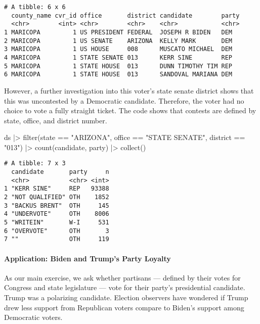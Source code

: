 \documentclass[fleqn,10pt]{wlscirep}
\let\oldparagraph\paragraph
\renewcommand{\paragraph}[1]{\oldparagraph{#1}\mbox{}}
\newenvironment{Shaded}{\begin{snugshade}}{\end{snugshade}}
\newcommand{\FunctionTok}[1]{\textcolor[rgb]{0.28,0.35,0.67}{#1}}
\newcommand{\NormalTok}[1]{\textcolor[rgb]{0.00,0.23,0.31}{#1}}
\newcommand{\SpecialCharTok}[1]{\textcolor[rgb]{0.37,0.37,0.37}{#1}}
\newcommand{\StringTok}[1]{\textcolor[rgb]{0.13,0.47,0.30}{#1}}
\begin{document}
\begin{verbatim}
# A tibble: 6 x 6
  county_name cvr_id office       district candidate        party
  <chr>        <int> <chr>        <chr>    <chr>            <chr>
1 MARICOPA         1 US PRESIDENT FEDERAL  JOSEPH R BIDEN   DEM  
2 MARICOPA         1 US SENATE    ARIZONA  KELLY MARK       DEM  
3 MARICOPA         1 US HOUSE     008      MUSCATO MICHAEL  DEM  
4 MARICOPA         1 STATE SENATE 013      KERR SINE        REP  
5 MARICOPA         1 STATE HOUSE  013      DUNN TIMOTHY TIM REP  
6 MARICOPA         1 STATE HOUSE  013      SANDOVAL MARIANA DEM  
\end{verbatim}

However, a further investigation into this voter's state senate district
shows that this was uncontested by a Democratic candidate. Therefore,
the voter had no choice to vote a fully straight ticket. The code shows
that contests are defined by state, office, and district number.

\begin{Shaded}
\begin{Highlighting}[]
\NormalTok{ds }\SpecialCharTok{|\textgreater{}} 
  \FunctionTok{filter}\NormalTok{(state }\SpecialCharTok{==} \StringTok{"ARIZONA"}\NormalTok{, office }\SpecialCharTok{==} \StringTok{"STATE SENATE"}\NormalTok{, district }\SpecialCharTok{==} \StringTok{"013"}\NormalTok{) }\SpecialCharTok{|\textgreater{}} 
  \FunctionTok{count}\NormalTok{(candidate, party) }\SpecialCharTok{|\textgreater{}} 
  \FunctionTok{collect}\NormalTok{()}
\end{Highlighting}
\end{Shaded}

\begin{verbatim}
# A tibble: 7 x 3
  candidate       party     n
  <chr>           <chr> <int>
1 "KERR SINE"     REP   93388
2 "NOT QUALIFIED" OTH    1852
3 "BACKUS BRENT"  OTH     145
4 "UNDERVOTE"     OTH    8006
5 "WRITEIN"       W-I     531
6 "OVERVOTE"      OTH       3
7 ""              OTH     119
\end{verbatim}

\paragraph{Application: Biden and Trump's Party Loyalty}

As our main exercise, we ask whether partisans --- defined by their
votes for Congress and state legislature --- vote for their party's
presidential candidate. Trump was a polarizing candidate. Election
observers have wondered if Trump drew less support from Republican
voters compare to Biden's support among Democratic voters.
\end{document}
